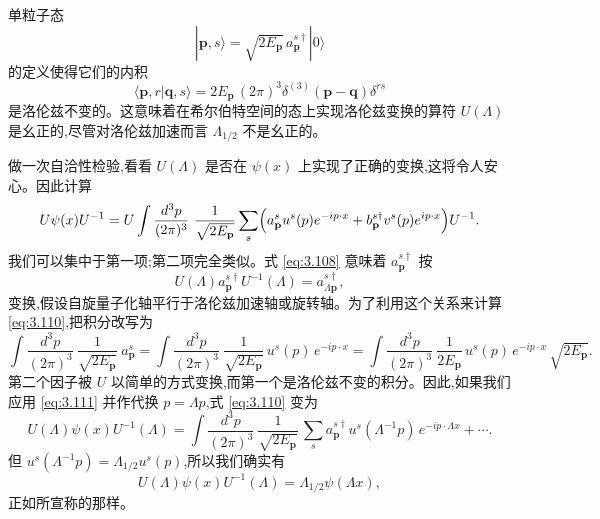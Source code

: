 单粒子态
\begin{equation}
  |\mathbf{p}, s\rangle = \sqrt{2E_{\mathbf{p}}}\,a_{\mathbf{p}}^{s\dagger}|0\rangle
  \label{eq:3.108}
\end{equation}
的定义使得它们的内积
\begin{equation}
  \langle\mathbf{p}, r|\mathbf{q}, s\rangle
    = 2E_{\mathbf{p}}\,(2\pi)^3\delta^{(3)}(\mathbf{p}-\mathbf{q})\delta^{rs}
  \label{eq:3.109}
\end{equation}
是洛伦兹不变的。这意味着在希尔伯特空间的态上实现洛伦兹变换的算符 $U(\Lambda)$ 是幺正的,尽管对洛伦兹加速而言 $\Lambda_{1/2}$ 不是幺正的。

做一次自洽性检验,看看 $U(\Lambda)$ 是否在 $\psi(x)$ 上实现了正确的变换,这将令人安心。因此计算
\begin{equation}
  U\psi(x)U^{-1} = U \int \frac{d^3p}{(2\pi)^3}\ \frac{1}{\sqrt{2E_{\mathbf{p}}}}
    \sum_s \Bigl( a_{\mathbf{p}}^s u^s(p)e^{-ip\cdot x}
      + b_{\mathbf{p}}^{s\dagger} v^s(p)e^{ip\cdot x} \Bigr) U^{-1}.
  \label{eq:3.110}
\end{equation}
我们可以集中于第一项;第二项完全类似。式 \eqref{eq:3.108} 意味着 $a_{\mathbf{p}}^{s\dagger}$ 按
\begin{equation}
  U(\Lambda)a_{\mathbf{p}}^{s\dagger}U^{-1}(\Lambda)
    = a_{\Lambda\mathbf{p}}^{s\dagger},
  \label{eq:3.111}
\end{equation}
变换,假设自旋量子化轴平行于洛伦兹加速轴或旋转轴。为了利用这个关系来计算 \eqref{eq:3.110},把积分改写为
\begin{equation}
  \int \frac{d^3p}{(2\pi)^3}\ \frac{1}{\sqrt{2E_{\mathbf{p}}}}\ a_{\mathbf{p}}^s
    = \int \frac{d^3p}{(2\pi)^3}\ \frac{1}{\sqrt{2E_{\mathbf{p}}}}\,
      u^s(p)\, e^{-ip\cdot x}
    = \int \frac{d^3p}{(2\pi)^3}\ \frac{1}{2E_{\mathbf{p}}}\,
      u^s(p)\, e^{-ip\cdot x}\, \sqrt{2E_{\mathbf{p}}} .
\end{equation}
第二个因子被 $U$ 以简单的方式变换,而第一个是洛伦兹不变的积分。因此,如果我们应用 \eqref{eq:3.111} 并作代换 $p = \Lambda p$,式 \eqref{eq:3.110} 变为
\begin{equation}
  U(\Lambda)\psi(x)U^{-1}(\Lambda) =
    \int \frac{d^3p}{(2\pi)^3}\ \frac{1}{\sqrt{2E_{\mathbf{p}}}}\,
    \sum_s a_{\mathbf{p}}^{s\dagger}
    u^s(\Lambda^{-1}p)\, e^{-ip\cdot \Lambda x} + \cdots .
\end{equation}
但 $u^s(\Lambda^{-1}p) = \Lambda_{1/2}u^s(p)$,所以我们确实有
\begin{equation}
  U(\Lambda)\psi(x)U^{-1}(\Lambda) = \Lambda_{1/2}\psi(\Lambda x),
  \label{eq:3.112}
\end{equation}
正如所宣称的那样。

